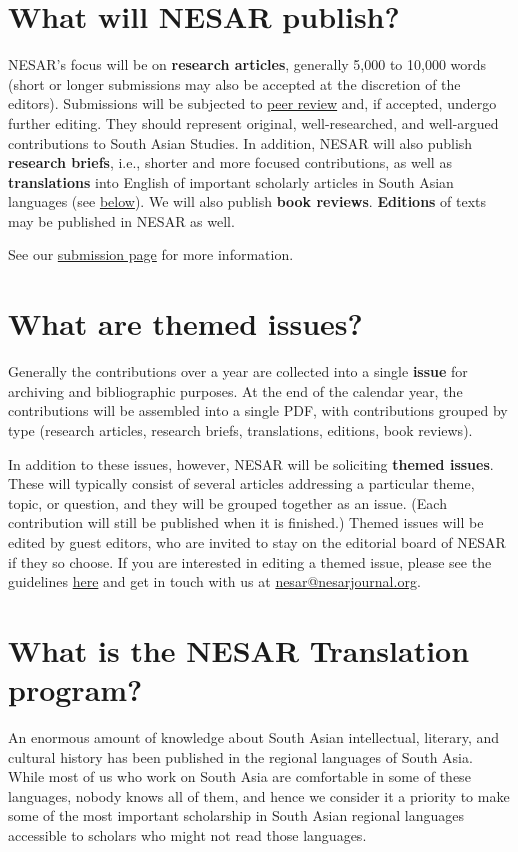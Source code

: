\section{What will NESAR publish?}\label{noqmodsg6hy3}
      NESAR’s focus will be on \textbf{research articles}, generally 5,000 to 10,000 words (short or longer submissions may also be accepted at the discretion of the editors). Submissions will be subjected to \hyperref[a4tnixdc6uio]{peer review} and, if accepted, undergo further editing. They should represent original, well-researched, and well-argued contributions to South Asian Studies. In addition, NESAR will also publish \textbf{research briefs}, i.e., shorter and more focused contributions, as well as \textbf{translations} into English of important scholarly articles in South Asian languages (see \hyperref[ubuln5nj0mzf]{below}). We will also publish \textbf{book reviews}. \textbf{Editions} of texts may be published in NESAR as well. 

See our \href{https://nesarjournal.org/submit}{submission page} for more information.

\section{What are themed issues?}\label{zlb5bpvfbnu}
      Generally the contributions over a year are collected into a single \textbf{issue} for archiving and bibliographic purposes. At the end of the calendar year, the contributions will be assembled into a single PDF, with contributions grouped by type (research articles, research briefs, translations, editions, book reviews). 

In addition to these issues, however, NESAR will be soliciting \textbf{themed issues}. These will typically consist of several articles addressing a particular theme, topic, or question, and they will be grouped together as an issue. (Each contribution will still be published when it is finished.) Themed issues will be edited by guest editors, who are invited to stay on the editorial board of NESAR if they so choose. If you are interested in editing a themed issue, please see the guidelines \href{https://nesarjournal.org/submit\#for-prospective-special-issue-editors}{here} and get in touch with us at \href{mailto:nesar@nesarjournal.org}{nesar@nesarjournal.org}.

\section{What is the NESAR Translation program?}\label{ubuln5nj0mzf}
      An enormous amount of knowledge about South Asian intellectual, literary, and cultural history has been published in the regional languages of South Asia. While most of us who work on South Asia are comfortable in some of these languages, nobody knows all of them, and hence we consider it a priority to make some of the most important scholarship in South Asian regional languages accessible to scholars who might not read those languages. 

